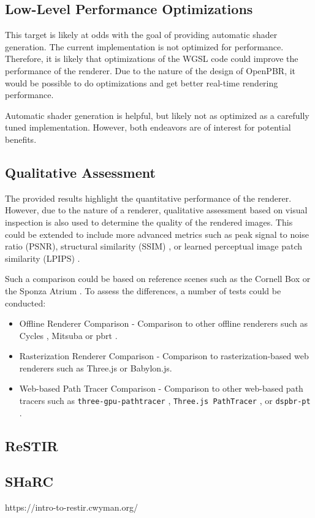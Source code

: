 \subsection*{Low-Level Performance Optimizations}

This target is likely at odds with the goal of providing automatic shader generation. The current implementation is not optimized for performance. Therefore, it is likely that optimizations of the \gls{WGSL} code could improve the performance of the renderer. Due to the nature of the design of \gls{OpenPBR}, it would be possible to do optimizations and get better real-time rendering performance.

Automatic shader generation is helpful, but likely not as optimized as a carefully tuned implementation. However, both endeavors are of interest for potential benefits.

\subsection*{Qualitative Assessment}

The provided results highlight the quantitative performance of the renderer. However, due to the nature of a renderer, qualitative assessment based on visual inspection is also used to determine the quality of the rendered images. This could be extended to include more advanced metrics such as peak signal to noise ratio (PSNR), structural similarity (SSIM) \cite{ssim}, or learned perceptual image patch similarity (LPIPS) \cite{lpips}.

Such a comparison could be based on reference scenes such as the Cornell Box \cite{goral1984modeling} or the Sponza Atrium \cite{dabrovic2002sponza}. To assess the differences, a number of tests could be conducted:

\begin{itemize}
    \item{Offline Renderer Comparison} - Comparison to other offline renderers such as Cycles \cite{cycles}, Mitsuba \cite{Jakob2020DrJit} or \gls{pbrt} \cite{Pharr_Physically_Based_Rendering_2023}.
    \item{Rasterization Renderer Comparison} - Comparison to rasterization-based web renderers such as \gls{Three.js} or \gls{Babylon.js}.
    \item{Web-based Path Tracer Comparison} - Comparison to other web-based path tracers such as \texttt{three-gpu-pathtracer} \cite{ThreeJsPathTracerJohnson}, \texttt{Three.js PathTracer} \cite{ThreeJsPathTracerLoftis}, or \texttt{dspbr-pt} \cite{PathTracerDassault}.
\end{itemize}


\subsection{ReSTIR}
\subsection{SHaRC}

https://intro-to-restir.cwyman.org/